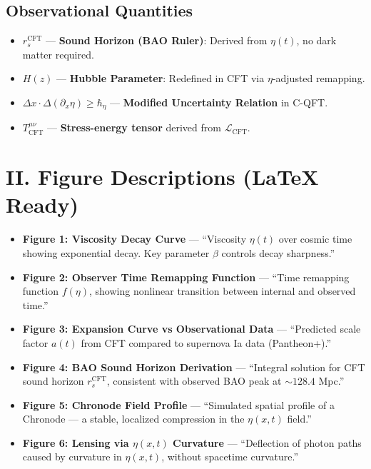 \documentclass[12pt]{article}
\begin{document}
\subsection*{Observational Quantities}
\begin{itemize}
  \item $r_s^{\text{CFT}}$ — \textbf{Sound Horizon (BAO Ruler)}: Derived from $\eta(t)$, no dark matter required.
  \item $H(z)$ — \textbf{Hubble Parameter}: Redefined in CFT via $\eta$-adjusted remapping.
  \item $\Delta x \cdot \Delta(\partial_x \eta) \geq \hbar_\eta$ — \textbf{Modified Uncertainty Relation} in C-QFT.
  \item $T^{\mu\nu}_{\text{CFT}}$ — \textbf{Stress-energy tensor} derived from $\mathcal{L}_{\text{CFT}}$.
\end{itemize}

\section*{II. Figure Descriptions (LaTeX Ready)}

\begin{itemize}
  \item \textbf{Figure 1: Viscosity Decay Curve} — ``Viscosity $\eta(t)$ over cosmic time showing exponential decay. Key parameter $\beta$ controls decay sharpness.''
  \item \textbf{Figure 2: Observer Time Remapping Function} — ``Time remapping function $f(\eta)$, showing nonlinear transition between internal and observed time.''
  \item \textbf{Figure 3: Expansion Curve vs Observational Data} — ``Predicted scale factor $a(t)$ from CFT compared to supernova Ia data (Pantheon+).''
  \item \textbf{Figure 4: BAO Sound Horizon Derivation} — ``Integral solution for CFT sound horizon $r_s^{\text{CFT}}$, consistent with observed BAO peak at $\sim 128.4$ Mpc.''
  \item \textbf{Figure 5: Chronode Field Profile} — ``Simulated spatial profile of a Chronode — a stable, localized compression in the $\eta(x,t)$ field.''
  \item \textbf{Figure 6: Lensing via $\eta(x,t)$ Curvature} — ``Deflection of photon paths caused by curvature in $\eta(x,t)$, without spacetime curvature.''
\end{itemize}
\end{document}
